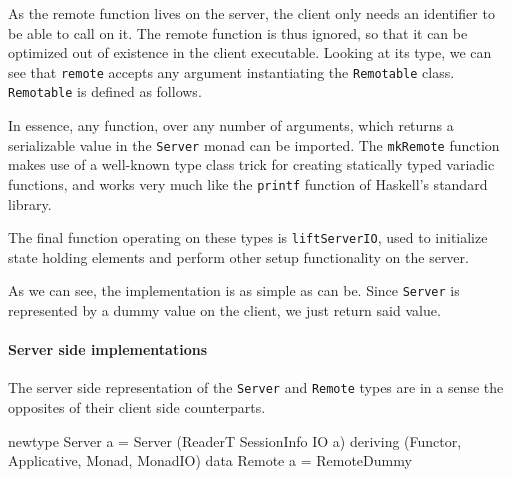 \documentclass[preprint]{sigplanconf}
\begin{document}
As the remote function lives on the server, the client only needs an
identifier to be able to call on it. The remote function is thus ignored,
so that it can be optimized out of existence in the client executable. Looking
at its type, we can see that \lstinline!remote! accepts any argument
instantiating the \lstinline!Remotable! class.
\lstinline!Remotable! is defined as follows.


In essence, any function, over any number of arguments, which returns a
serializable value in the \lstinline!Server! monad can be imported. The
\lstinline!mkRemote! function makes use of a well-known type class trick for
creating statically typed variadic functions, and works very much like the
\lstinline!printf! function of Haskell's standard library.\ \cite{printf}

The final function operating on these types is \lstinline!liftServerIO!, used
to initialize state holding elements and perform other setup functionality on
the server.


As we can see, the implementation is as simple as can be. Since
\lstinline!Server! is represented by a dummy value on the client, we
just return said value.

\paragraph{Server side implementations}
The server side representation of the \lstinline!Server! and
\lstinline!Remote! types are in a sense the opposites of their client side
counterparts.

\begin{code}
newtype Server a = Server (ReaderT SessionInfo IO a)
  deriving (Functor, Applicative, Monad, MonadIO)
data Remote a = RemoteDummy
\end{code}
\end{document}

